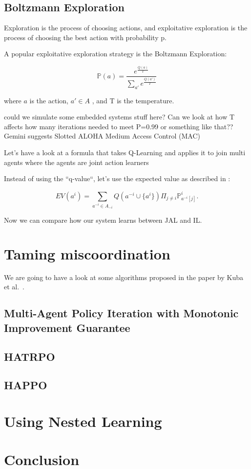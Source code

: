 \documentclass{article}
\theoremstyle{definition}    %
\begin{document}
\subsection{Boltzmann Exploration} 

Exploration is the process of choosing actions, and exploitative exploration \cite{watkins1992q} is the process of choosing the best action with probability p.

A popular exploitative exploration strategy is the Boltzmann Exploration:

$$
\mathbb{P}(a) = \frac{e^{\frac{Q(a)}{T}}}{\sum_{a'}^{}e^{\frac{Q(a')}{T}}} 
$$

where $a$ is the action, $a' \in A$ , and T is the temperature.

could we simulate some embedded systems stuff here? Can we look at how T affects how many iterations needed to meet P=0.99 or something like that?? Gemini suggests Slotted ALOHA Medium Access Control (MAC)

Let's have a look at a formula that takes Q-Learning and applies it to join multi agents where the agents are joint action learners \cite{claus1998dynamics}

Instead of using the ``q-value``, let's use the expected value as described in \cite{claus1998dynamics}:

$$
EV(a^i) = \sum_{a^{-i} \in A_{-i} }^{} Q(a^{-i} \cup \{a^i\}) \Pi_{j \neq i}^{}\mathbb{P}_{a^{-i}[j]}^{i}.
$$

Now we can compare how our system learns between JAL and IL.

\section{Taming miscoordination}

We are going to have a look at some algorithms proposed in the paper by Kuba et al.~\cite{Kuba2021HATRPO}.

\subsection{Multi-Agent Policy Iteration with Monotonic Improvement Guarantee}

\subsection{HATRPO}

\subsection{HAPPO}

\section{Using Nested Learning}

\section{Conclusion}

\newpage{}



\end{document}
